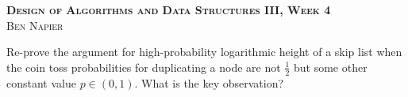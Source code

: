 \documentclass[a4paper, answers]{exam}
\begin{document}
\begin{center}
	\textbf{\textsc{Design of Algorithms and Data Structures III, Week 4}}
	\\
	\textsc{Ben Napier}
	\vspace{1em}
\end{center}

\begin{questions}
	\question
	Re-prove the argument for high-probability logarithmic height of a skip
	list when the coin toss probabilities for duplicating a node are not
	$\frac12$ but some other constant value $p \in (0,1)$.
	What is the key observation?
\end{questions}
\end{document}
